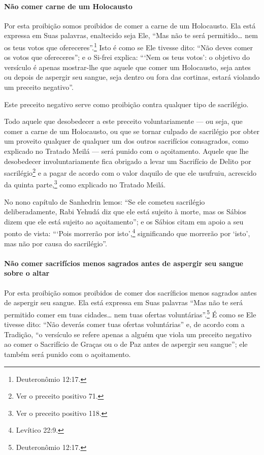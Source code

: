 \paragraph{Não comer carne de um Holocausto}

Por esta proibição somos proibidos de comer a carne de um Holocausto.
Ela está expressa em Suas palavras, enaltecido seja Ele, ``Mas não te
será permitido\ldots{} nem os teus votos que ofereceres''.\footnote{Deuteronômio
12:17.} Isto é como se Ele tivesse dito: ``Não deves comer os votos que
ofereceres''; e o Si-frei explica: ```Nem os teus votos': o objetivo do
versículo é apenas mostrar-lhe que aquele que comer um Holocausto, seja
antes ou depois de aspergir seu sangue, seja dentro ou fora das
cortinas, estará violando um preceito negativo''.

Este preceito negativo serve como proibição contra qualquer tipo de
sacrilégio.

Todo aquele que desobedecer a este preceito voluntariamente --- ou seja,
que comer a carne de um Holocausto, ou que se tornar culpado de
sacrilégio por obter um proveito qualquer de qualquer um dos outros
sacrifícios consagrados, como explicado no Tratado Meilá --- será
punido com o açoitamento. Aquele que lhe desobedecer involuntariamente
fica obrigado a levar um Sacrifício de Delito por
sacrilégio\footnote{Ver o preceito positivo 71.} e a pagar de acordo com o valor daquilo
de que ele usufruiu, acrescido da quinta parte,\footnote{Ver o preceito positivo 118.}
como explicado no Tratado Meilá.

No nono capítulo de Sanhedrin lemos: ``Se ele cometeu sacrilégio
deliberadamente, Rabi Yehudá diz que ele está sujeito à morte, mas os
Sábios dizem que ele está sujeito ao açoitamento''; e os Sábios citam em
apoio a seu ponto de vista: ```Pois morrerão por isto',\footnote{Levítico 22:9.}
significando que morrerão por `isto', mas não por causa do
sacrilégio''.

\paragraph{Não comer sacrifícios menos sagrados antes de aspergir seu sangue sobre o altar}

Por esta proibição somos proibidos de comer dos sacríficios menos
sagrados antes de aspergir seu sangue. Ela está expressa em Suas
palavras ``Mas não te será permitido comer em tuas cidades\ldots{} nem tuas
ofertas voluntárias''.\footnote{Deuteronômio 12:17.} É como se Ele tivesse dito:
``Não deverás comer tuas ofertas voluntárias'' e, de acordo com a
Tradição, ``o versículo se refere apenas
a alguém que viola um preceito negativo ao comer o Sacrifício de Graças
ou o de Paz antes de aspergir seu sangue''; ele também será punido com o
açoitamento.

